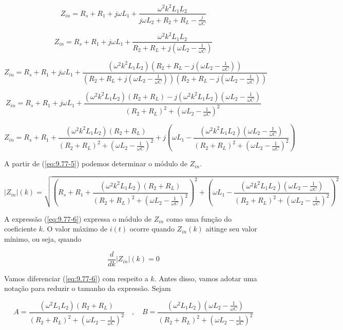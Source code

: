 \[ Z_{in} = R_s + R_1 + j \omega L_1 + \frac{\omega^2k^2L_1L_2}{j\omega L_2 + R_2 + R_L - \frac{j}{\omega C}} \]

\[ Z_{in} = R_s + R_1 + j \omega L_1 + \frac{\omega^2k^2L_1L_2}{R_2 + R_L + j(\omega L_2 - \frac{1}{\omega C})} \]

\[ Z_{in} = R_s + R_1 + j \omega L_1 + \frac{(\omega^2k^2L_1L_2)(R_2 + R_L - j(\omega L_2 - \frac{1}{\omega C}))}{(R_2 + R_L + j(\omega L_2 - \frac{1}{\omega C}))(R_2 + R_L - j(\omega L_2 - \frac{1}{\omega C}))} \]

\[ Z_{in} = R_s + R_1 + j \omega L_1 + \frac{(\omega^2k^2L_1L_2)(R_2 + R_L) - j(\omega^2k^2L_1L_2)(\omega L_2 - \frac{1}{\omega C})}{(R_2 + R_L)^2 + (\omega L_2 - \frac{1}{\omega C})^2} \]

\begin{equation}\label{eq:9.77-5}\tag{9.77-5}
    Z_{in} = R_s + R_1 + \frac{(\omega^2k^2L_1L_2)(R_2 + R_L)}{(R_2 + R_L)^2 + (\omega L_2 - \frac{1}{\omega C})^2} + j \left(\omega L_1 - \frac{(\omega^2k^2L_1L_2)(\omega L_2 - \frac{1}{\omega C})}{(R_2 + R_L)^2 + (\omega L_2 - \frac{1}{\omega C})^2}\right)
\end{equation}

A partir de (\ref{eq:9.77-5}) podemos determinar o módulo de \(Z_{in}\).

\begin{equation}\label{eq:9.77-6}\tag{9.77-6}
    |Z_{in}|(k) = \sqrt{\left(R_s + R_1 + \frac{(\omega^2k^2L_1L_2)(R_2 + R_L)}{(R_2 + R_L)^2 + (\omega L_2 - \frac{1}{\omega C})^2}\right)^2 + \left(\omega L_1 - \frac{(\omega^2k^2L_1L_2)(\omega L_2 - \frac{1}{\omega C})}{(R_2 + R_L)^2 + (\omega L_2 - \frac{1}{\omega C})^2}\right)^2}
\end{equation}

A expressão (\ref{eq:9.77-6}) expressa o módulo de \(Z_{in}\) como uma função do coeficiente \(k\). O valor máximo de \(i(t)\) ocorre quando \(Z_{in}(k)\) aitinge seu valor mínimo, ou seja, quando

\begin{equation}\label{eq:9.77-7}\tag{9.77-7}
    \frac{d}{dk}|Z_{in}|(k) = 0
\end{equation}

Vamos diferenciar (\ref{eq:9.77-6}) com respeito a \(k\). Antes disso, vamos adotar uma notação para reduzir o tamanho da expressão.
Sejam

\[ 
    A = \frac{(\omega^2L_1L_2)(R_2 + R_L)}{(R_2 + R_L)^2 + (\omega L_2 - \frac{1}{\omega C})^2} 
    \quad , \quad
    B = \frac{(\omega^2L_1L_2)(\omega L_2 - \frac{1}{\omega C})}{(R_2 + R_L)^2 + (\omega L_2 - \frac{1}{\omega C})^2}
\]


